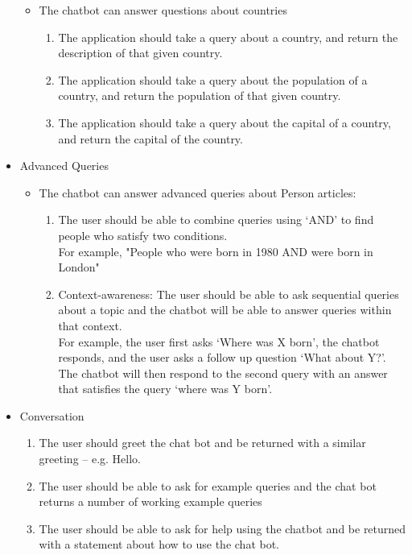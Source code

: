 \begin{itemize}
\begin{itemize}
\begin{enumerate}[resume*]
		\end{enumerate}
		\item The chatbot can answer questions about countries
		\begin{enumerate}[resume*]
			\item The application should take a query about a country, and return the description of that given country.
			\item The application should take a query about the population of a country, and return the population of that given country.
			\item The application should take a query about the capital of a country, and return the capital of the country.
			
		\end{enumerate}
	\end{itemize}
	\item Advanced Queries
	\begin{itemize}
		\item The chatbot can answer advanced queries about Person articles:
		\begin{enumerate}[resume*]
			\item The user should be able to combine queries using ‘AND’ to find people who satisfy two conditions. \\For example, "People who were born in 1980 AND were born in London"
			\item Context-awareness: The user should be able to ask sequential queries about a topic and the chatbot will be able to answer queries within that context. \\ For example, the user first asks ‘Where was X born’, the chatbot responds, and the user asks a follow up question ‘What about Y?’. The chatbot will then respond to the second query with an answer that satisfies the query ‘where was Y born’.
		\end{enumerate}
	\end{itemize}
	\item Conversation
	\begin{enumerate}[resume*]
		\item The user should greet the chat bot and be returned with a similar greeting – e.g. Hello.
		\item The user should be able to ask for example queries and the chat bot returns a number of working example queries
		\item The user should be able to ask for help using the chatbot and be returned with a statement about how to use the chat bot.
	\end{enumerate}
\end{itemize}

